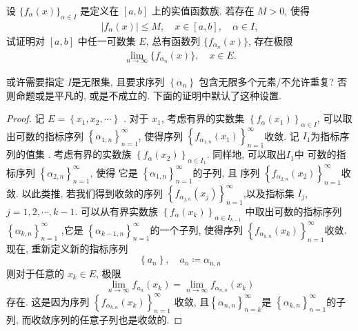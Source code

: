 \documentclass[../main.tex]{subfiles}
\begin{document}
\begin{exercise}{}{}
设 $\{f_\alpha(x)\}_{\alpha \in I}$ 是定义在 $[a,b]$ 上的实值函数族. 若存在 $M > 0$, 使得
\[\begin{aligned}
|f_\alpha(x)| \le M, \quad x \in [a,b], \quad \alpha \in I,
\end{aligned}\]
试证明对 $[a,b]$ 中任一可数集 $E$, 总有函数列 $\{f_{\alpha_n}(x)\}$, 存在极限
\[\begin{aligned}
\lim_{n \to \infty} \{f_{\alpha_n}(x)\}, \quad x \in E.
\end{aligned}\]
\end{exercise}
\begin{remark}
    或许需要指定 \(  I  \)是无限集, 且要求序列 \(  \left\{ \alpha _{n} \right\}  \) 包含无限多个元素/不允许重复? 否则命题或是平凡的, 或是不成立的.  下面的证明中默认了这种设置.
\end{remark}
\begin{proof}
    记 \(  E= \left\{ x_1,x_2,\cdots  \right\}  \) . 对于 \(  x_1  \), 考虑有界的实数集 \(  \left\{ f_{\alpha }\left( x_1 \right)  \right\}_{\alpha \in I}  \), 可以取出可数的指标序列 \(  \left\{ \alpha _{1,n} \right\}_{n = 1}^{\infty}  \), 使得序列 \(  \left\{ f_{ \alpha _{1,n}}\left( x_1 \right)  \right\}_{n = 1}^{\infty}  \)收敛.  记 \(  I_1  \)为指标序列的值集 . 考虑有界的实数族 \(  \left\{ f_{\alpha }\left( x_2 \right)  \right\}_{\alpha \in I_1}  \). 同样地, 可以取出\(  I_1  \)中 可数的指标序列 \(  \left\{ \alpha _{2,n} \right\}_{n = 1}^{\infty}  \), 使得 它是 \(  \left\{ \alpha _{1,n} \right\}_{n = 1}^{\infty}  \)的子列, 且  序列 \(  \left\{ f_{\alpha _{2,n}}\left( x_2 \right)  \right\}_{n = 1}^{\infty}  \)收敛. 以此类推, 若我们得到收敛的序列 \(  \left\{ f_{\alpha _{j,n}}\left( x_{j} \right)  \right\}_{n = 1}^{\infty}\),以及指标集 \(  I_{j}  \), \(  j= 1,2,\cdots ,k -1 \).  可以从有界实数族 \(  \left\{ f_{\alpha }\left( x_{k} \right)  \right\}_{ \alpha \in I_{k-1}}  \)    中取出可数的指标序列 \(  \left\{ \alpha _{k,n} \right\}_{n = 1}^{\infty}  \) ,它是 \(  \left\{ \alpha _{k-1,n} \right\}_{n = 1}^{\infty}  \)的一个子列,  使得序列 \(  \left\{ f_{\alpha _{k,n}}\left( x_{k} \right)  \right\}_{n = 1}^{\infty}  \)收敛. 现在, 重新定义新的指标序列 \[
    \left\{ a_{n} \right\}, \quad a_{n}\coloneqq \alpha _{n,n}
    \]则对于任意的 \(  x_{k } \in E  \), 极限 \[
    \lim_{n\to \infty}f_{a_{n}}\left( x_{k} \right)= \lim_{n\to \infty}f_{\alpha _{n,n}} \left( x_{k} \right)
    \]存在. 这是因为序列 \(  \left\{ f_{\alpha _{k,n}}\left( x _{k}\right)  \right\}_{n = 1}^{\infty}  \)  收敛, 且\(  \left\{ \alpha  _{n,n} \right\}_{n = k}^{\infty}  \)是 \(  \left\{ \alpha _{k,n} \right\}_{n = 1}^{\infty}  \)的子列, 而收敛序列的任意子列也是收敛的.   
\end{proof}
\end{document}
